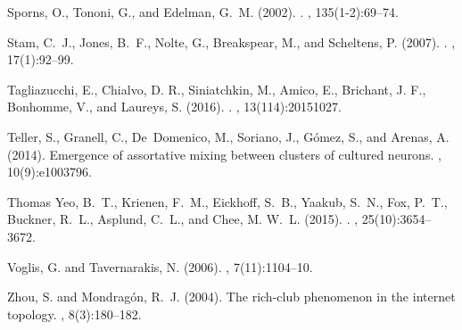 \documentclass[preprintnumbers,amsmath,amssymb,onecolumn]{revtex4}
\begin{document}
\begin{thebibliography}{99}
Sporns, O., Tononi, G., and Edelman, G.~M. (2002).
.
, 135(1-2):69--74.

Stam, C.~J., Jones, B.~F., Nolte, G., Breakspear, M., and Scheltens, P. (2007).
.
, 17(1):92--99.

Tagliazucchi, E., Chialvo, D. R., Siniatchkin, M., Amico, E., Brichant, J. F.,
 Bonhomme, V., and Laureys, S. (2016). 
. 
, 13(114):20151027.

Teller, S., Granell, C., De~Domenico, M., Soriano, J., G{\'o}mez, S., and
  Arenas, A. (2014).
\newblock Emergence of assortative mixing between clusters of cultured neurons.
, 10(9):e1003796.

{Thomas Yeo}, B.~T., Krienen, F.~M., Eickhoff, S.~B., Yaakub, S.~N., Fox,
  P.~T., Buckner, R.~L., Asplund, C.~L., and Chee, M. W.~L. (2015).
.
, 25(10):3654--3672.

Voglis, G. and Tavernarakis, N. (2006).
, 7(11):1104--10.

Zhou, S. and Mondrag{\'o}n, R.~J. (2004).
\newblock The rich-club phenomenon in the internet topology.
, 8(3):180--182.


\end{thebibliography}
\end{document}
